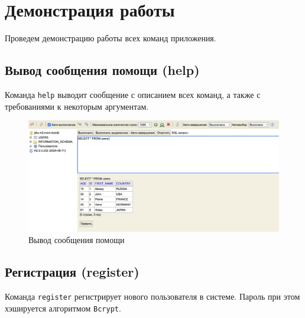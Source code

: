 \documentclass[a4paper, 14pt]{article}
\begin{document}
\newpage
\section{Демонстрация работы}

Проведем демонстрацию работы всех команд приложения.

\subsection{Вывод сообщения помощи (help)}

Команда \texttt{help} выводит сообщение с описанием всех команд, а также с требованиями к некоторым аргументам.

\begin{figure}[H]
	\centering
	\includegraphics[width=17cm]{resources/4.png}
	\caption{Вывод сообщения помощи}
\end{figure}

\subsection{Регистрация (register)}

Команда \texttt{register} регистрирует нового пользователя в системе. Пароль при этом хэшируется алгоритмом \texttt{Bcrypt}.
\end{document}
